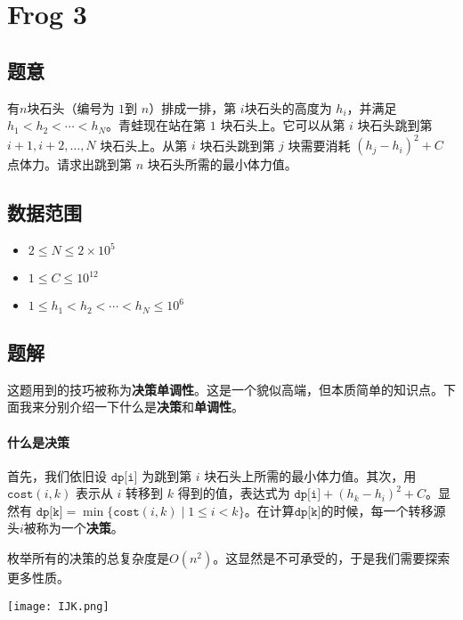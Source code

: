 \section{Frog 3}
\subsection*{题意}
有$n$块石头（编号为 $1$到 $n$）排成一排，第 $i$块石头的高度为 $h_i$，并满足 $h_1 < h_2 < \cdots < h_N$。青蛙现在站在第 $1$ 块石头上。它可以从第 $i$ 块石头跳到第 $i + 1, i + 2, \ldots, N$ 块石头上。从第 $i$ 块石头跳到第 $j$ 块需要消耗 $(h_j - h_i)^2+C$ 点体力。请求出跳到第 $n$ 块石头所需的最小体力值。
\subsection*{数据范围}
\begin{itemize}
\item $2 \leq N \leq 2 \times 10^5$
\item $1 \leq C \leq 10^{12}$
\item $1 \leq h_1 < h_2 < \cdots < h_N \leq 10^6$
\end{itemize}

\subsection*{题解}
这题用到的技巧被称为\textbf{决策单调性}。这是一个貌似高端，但本质简单的知识点。下面我来分别介绍一下什么是\textbf{决策}和\textbf{单调性}。

\paragraph{什么是决策}首先，我们依旧设 $\texttt{dp[i]}$ 为跳到第 $i$ 块石头上所需的最小体力值。其次，用 $\texttt{cost}(i,k)$ 表示从 $i$ 转移到 $k$ 得到的值，表达式为 $\texttt{dp[i]} + (h_k - h_i)^2+C$。显然有 $\texttt{dp[k]} = \min\{\texttt{cost}(i,k) \mid 1\le i<k\}$。在计算$\texttt{dp[k]}$的时候，每一个转移源头$i$被称为一个\textbf{决策}。

枚举所有的决策的总复杂度是$O(n^2)$。这显然是不可承受的，于是我们需要探索更多性质。

\begin{center}
\texttt{[image: IJK.png]}
\end{center}

